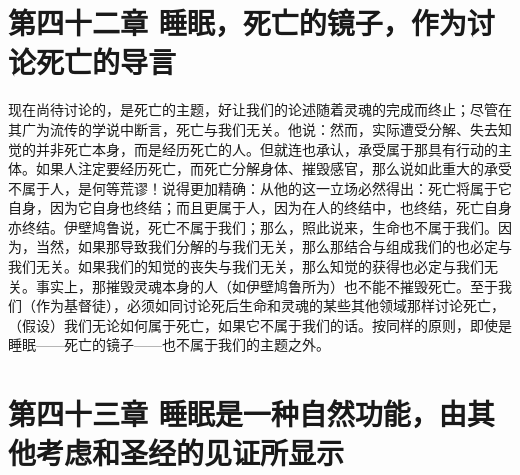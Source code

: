 
\section{第四十二章  睡眠，死亡的镜子，作为讨论死亡的导言}

现在尚待讨论的，是死亡的主题，好让我们的论述随着灵魂的完成而终止；尽管在其广为流传的学说中断言，死亡与我们无关。他说：然而，实际遭受分解、失去知觉的并非死亡本身，而是经历死亡的人。但就连也承认，承受属于那具有行动的主体。如果人注定要经历死亡，而死亡分解身体、摧毁感官，那么说如此重大的承受不属于人，是何等荒谬！说得更加精确：从他的这一立场必然得出：死亡将属于它自身，因为它自身也终结；而且更属于人，因为在人的终结中，也终结，死亡自身亦终结。伊壁鸠鲁说，死亡不属于我们；那么，照此说来，生命也不属于我们。因为，当然，如果那导致我们分解的与我们无关，那么那结合与组成我们的也必定与我们无关。如果我们的知觉的丧失与我们无关，那么知觉的获得也必定与我们无关。事实上，那摧毁灵魂本身的人（如伊壁鸠鲁所为）也不能不摧毁死亡。至于我们（作为基督徒），必须如同讨论死后生命和灵魂的某些其他领域那样讨论死亡，（假设）我们无论如何属于死亡，如果它不属于我们的话。按同样的原则，即使是睡眠——死亡的镜子——也不属于我们的主题之外。\par


\section{第四十三章  睡眠是一种自然功能，由其他考虑和圣经的见证所显示}

